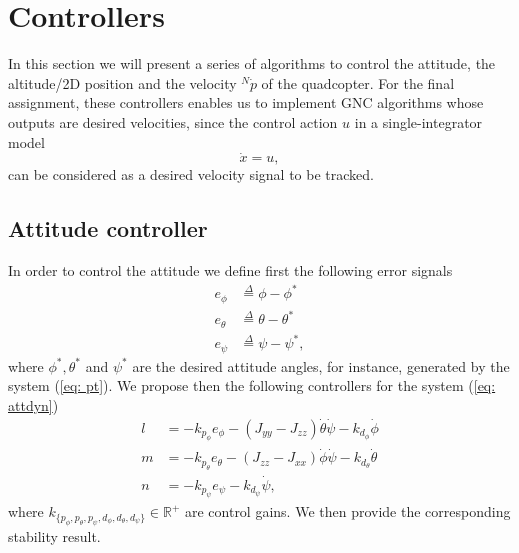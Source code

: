 \documentclass[a4paper, onecolumn]{ieeeconf}
\newcommand{\dfb}{\stackrel{\Delta}{=}}
\newcommand{\R}{\ensuremath{\mathbb R}}
\begin{document}
\section{Controllers}
\label{sec: con}
In this section we will present a series of algorithms to control the attitude, the altitude/2D position and the velocity $^N\dot p$ of the quadcopter. For the final assignment, these controllers enables us to implement GNC algorithms whose outputs are desired velocities, since the control action $u$ in a single-integrator model
\begin{equation}
\dot x = u,
\end{equation}
can be considered as a desired velocity signal to be tracked.

\subsection{Attitude controller}
In order to control the attitude we define first the following error signals
\begin{align}
	e_\phi &\dfb \phi - \phi^* \\
	e_\theta &\dfb \theta - \theta^* \\
	e_\psi &\dfb \psi - \psi^*,
\end{align}
where $\phi^*, \theta^*$ and $\psi^*$ are the desired attitude angles, for instance, generated by the system (\ref{eq: pt}). We propose then the following controllers for the system (\ref{eq: attdyn})
\begin{align}
	l &= -k_{p_\phi}e_\phi - (J_{yy}-J_{zz})\dot\theta\dot\psi - k_{d_\phi}\dot\phi \label{eq: lq} \\
	m &= -k_{p_\theta}e_\theta - (J_{zz}-J_{xx})\dot\phi\dot\psi - k_{d_\theta}\dot\theta \label{eq: mq}\\
	n &= -k_{p_\psi}e_\psi - k_{d_\psi}\dot\psi, \label{eq: nq}
\end{align}
where $k_{\{p_\phi,p_\theta,p_\psi,d_\phi,d_\theta,d_\psi\}}\in\R^+$ are control gains. We then provide the corresponding stability result.
\end{document}
